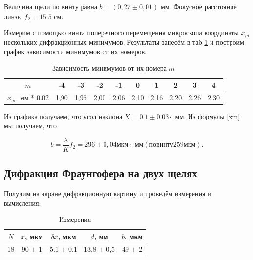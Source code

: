 \documentclass[a4paper,12pt]{article} %
\begin{document}
Величина щели по винту равна $ b = (0,27\pm0,01)$ мм. Фокусное расстояние линзы $ f_2 = 15.5$ см.

Измерим с помощью винта поперечного перемещения микроскопа координаты $ x_m $ нескольких дифракционных минимумов.
Результаты занесём в таб \ref{tab2} и построим график зависимости минимумов от их номеров. 

\begin{table}[H]
	\caption{Зависимость минимумов от их номера $ m $}
	\begin{center}
		\begin{tabular}{|c|c|c|c|c|c|c|c|c|c|} \hline
			$m$ & -4 & -3 & -2 & -1 & 0 & 1 & 2 & 3 & 4\\ \hline
			$ x_m $, мм * 0.02  & 1,90 & 1,96 & 2,00 & 2,06 & 2,10 & 2,16 & 2,20 & 2,26 & 2,30 \\ \hline
		\end{tabular}
	\end{center}
	\label{tab2}
\end{table}




Из графика получаем, что угол наклона $ K = 0.1 \pm 0.03 \cdot   $ мм. Из формулы \eqref{xm} мы получаем, что 

\begin{equation}\label{qqq}
b =  \dfrac{\lambda}{K} f_2 =  296 \pm 0,04 мкм \cdot \; \text{мм} (по винту 259мкм). 
\end{equation}

\subsection{Дифракция Фраунгофера на двух щелях}

Получим на экране дифракционную картину и проведём измерения и вычисления:

\begin{table}[H]
	\centering
	\caption{Измерения}
	\begin{tabular}{|c|c|c|c|c|} \hline
		$N$ &	$x$, мкм &	$\delta x$, мкм & $d$, мм & $b$, мкм \\
		\hline
		18	&	90 $\pm$ 1  & 5.1 $\pm$ 0,1 &	13,8 $\pm$ 0,5 &	49 $\pm$ 2 \\ \hline
	\end{tabular}   
\end{table}
\end{document}
